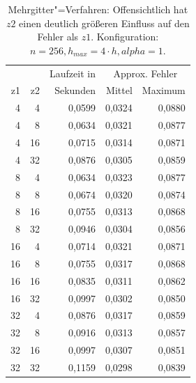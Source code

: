 \documentclass{beamer}
\begin{document}
\begin{table}
    \centering
    \begin{tabular}{|r|r|r|r|r|} \hline
    & & Laufzeit in & \multicolumn{2}{c|}{Approx. Fehler} \\
    z1 & z2 & Sekunden & Mittel & Maximum \\ \hline \hline
    4  & 4  & 0,0599   & 0,0324 & 0,0880  \\
    4  & 8  & 0,0634   & 0,0321 & 0,0877  \\
    4  & 16 & 0,0715   & 0,0314 & 0,0871  \\
    4  & 32 & 0,0876   & 0,0305 & 0,0859  \\ \hline
    8  & 4  & 0,0634   & 0,0323 & 0,0877  \\
    8  & 8  & 0,0674   & 0,0320 & 0,0874  \\
    8  & 16 & 0,0755   & 0,0313 & 0,0868  \\
    8  & 32 & 0,0946   & 0,0304 & 0,0856  \\ \hline
    16 & 4  & 0,0714   & 0,0321 & 0,0871  \\
    16 & 8  & 0,0755   & 0,0317 & 0,0868  \\
    16 & 16 & 0,0835   & 0,0311 & 0,0862  \\
    16 & 32 & 0,0997   & 0,0302 & 0,0850  \\ \hline
    32 & 4  & 0,0876   & 0,0317 & 0,0859  \\
    32 & 8  & 0,0916   & 0,0313 & 0,0857  \\
    32 & 16 & 0,0997   & 0,0307 & 0,0851  \\
    32 & 32 & 0,1159   & 0,0298 & 0,0839  \\ \hline
    \end{tabular}
    \caption{Mehrgitter"=Verfahren: Offensichtlich hat \(z2\) einen deutlich größeren Einfluss auf den Fehler als \(z1\). Konfiguration: \(n=256, h_{max}=4 \cdot h, alpha=1\).}
    \label{tab:b}
\end{table}
\end{document}
